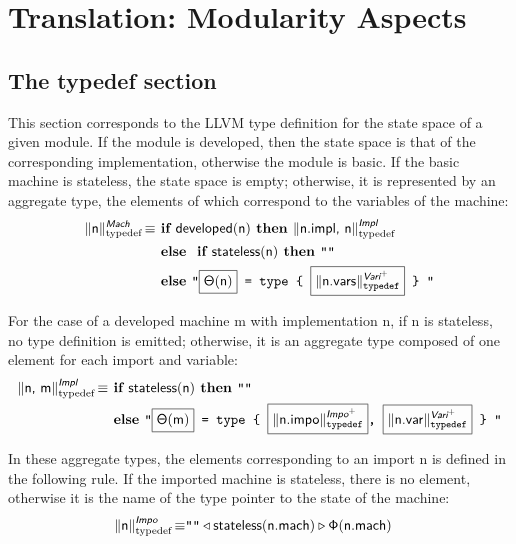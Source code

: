 \documentclass{llncs}
\newcommand{\trad}[2]{\ensuremath{\lVert \textsf{#1} \rVert^{\textit{#2}}}}
\DeclareMathOperator{\isdef}{\equiv}
\newcommand{\llvm}[1]{\texttt{#1}}
\newcommand{\B}[1]{\textsf{#1}}
\newcommand{\ListOf}[1]{$\mbox{#1}^+$}
\newcommand{\IF}[0]{\textbf{ if }}
\newcommand{\ELSE}[0]{\textbf{ else }}
\newcommand{\THEN}[0]{\textbf{ then }}
\newcommand{\PH}[1]{\framebox{$#1$}}
\newcommand{\developed}[0]{\ensuremath{\textsf{developed}}}
\newcommand{\stateless}[0]{\ensuremath{\textsf{stateless}}}
\newcommand{\state}[0]{\ensuremath{\sf\Theta}}
\newcommand{\stateref}[0]{\ensuremath{\sf\Phi}}
\begin{document}
\section{Translation: Modularity Aspects}
\label{sec:module}

\subsection{The typedef section}

This section corresponds to the LLVM type definition for the state space of a
given module. If the module is developed, then the state space is that of the
corresponding implementation, otherwise the module is basic. If the basic
machine is stateless, the state space is empty; otherwise, it is represented by
an aggregate type, the elements of which correspond to the variables of the
machine:
\begin{align*}
  \trad{\B{n}}{\B{Mach}}_{\text{typedef}} \isdef
  & \IF \developed(\B{n}) \THEN \trad{\B{n.impl}, \B{n}}{\B{Impl}}_{\text{typedef}} \\
  & \ELSE \IF \stateless(\B{n}) \THEN \llvm{""} \\
  & \ELSE \llvm{"\PH{\state(\B{n})} = type \{ \PH{\trad{\B{n.vars}}{\ListOf{\B{Vari}}}_{\text{typedef}}} \} "}
\end{align*}

For the case of a developed machine \B{m} with implementation \B{n}, if \B{n} is
stateless, no type definition is emitted; otherwise, it is an aggregate type
composed of one element for each import and variable:
\begin{align*}
  \trad{\B{n}, \B{m}}{\B{Impl}}_{\text{typedef}} \isdef
  & \IF \stateless(\B{n}) \THEN \llvm{""} \\
  & \ELSE \llvm{"\PH{\state(\B{m})} = type \{ \PH{\trad{\B{n.impo}}{\ListOf{\B{Impo}}}_{\text{typedef}}}, \PH{\trad{\B{n.var}}{\ListOf{\B{Vari}}}_{\text{typedef}}} \} "}
\end{align*}

In these aggregate types, the elements corresponding to an import \B{n} is
defined in the following rule. If the imported machine is stateless, there is no
element, otherwise it is the name of the type pointer to the state of the
machine:
\begin{align*}
  \trad{\B{n}}{\B{Impo}}_{\text{typedef}} \isdef
  & \llvm{""} \triangleleft \stateless(\B{n.mach}) \triangleright \stateref(\B{n.mach})
\end{align*}
\end{document}
